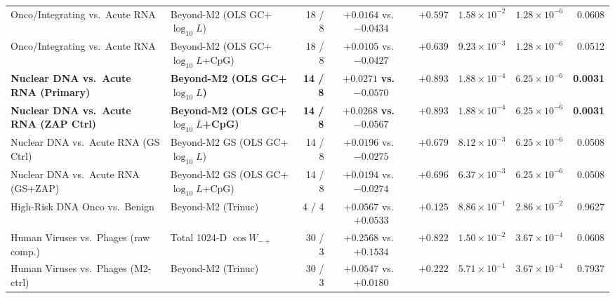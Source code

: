 \documentclass[11pt, a4paper]{article}
\DeclareRobustCommand{\_}{\textunderscore\allowbreak}
\begin{document}
\begin{table}[htbp]
{\begin{tabular}{@{}llrcrrrr@{}}
Onco/Integrating vs.\ Acute RNA & Beyond-M2 (OLS GC+$\log_{10}L$) & 18 / 8 & $+0.0164$ vs.\ $-0.0434$ & $+0.597$ & $1.58\times 10^{-2}$ & $1.28\times 10^{-6}$ & 0.0608 \\
Onco/Integrating vs.\ Acute RNA & Beyond-M2 (OLS GC+$\log_{10}L$+CpG) & 18 / 8 & $+0.0105$ vs.\ $-0.0427$ & $+0.639$ & $9.23\times 10^{-3}$ & $1.28\times 10^{-6}$ & 0.0512 \\
\midrule
\textbf{Nuclear DNA vs.\ Acute RNA (Primary)} & \textbf{Beyond-M2 (OLS GC+$\log_{10}L$)} & \textbf{14 / 8} & $\mathbf{+0.0271}$ \textbf{vs.}\ $\mathbf{-0.0570}$ & $\mathbf{+0.893}$ & \textbf{$1.88\times 10^{-4}$} & $6.25\times 10^{-6}$ & \textbf{0.0031} \\
\textbf{Nuclear DNA vs.\ Acute RNA (ZAP Ctrl)} & \textbf{Beyond-M2 (OLS GC+$\log_{10}L$+CpG)} & \textbf{14 / 8} & $\mathbf{+0.0268}$ \textbf{vs.}\ $\mathbf{-0.0567}$ & $\mathbf{+0.893}$ & \textbf{$1.88\times 10^{-4}$} & $6.25\times 10^{-6}$ & \textbf{0.0031} \\
Nuclear DNA vs.\ Acute RNA (GS Ctrl) & Beyond-M2 GS (OLS GC+$\log_{10}L$) & 14 / 8 & $+0.0196$ vs.\ $-0.0275$ & $+0.679$ & $8.12\times 10^{-3}$ & $6.25\times 10^{-6}$ & 0.0508 \\
Nuclear DNA vs.\ Acute RNA (GS+ZAP) & Beyond-M2 GS (OLS GC+$\log_{10}L$+CpG) & 14 / 8 & $+0.0194$ vs.\ $-0.0274$ & $+0.696$ & $6.37\times 10^{-3}$ & $6.25\times 10^{-6}$ & 0.0508 \\
\midrule
High-Risk DNA Onco vs.\ Benign & Beyond-M2 (Trinuc) & 4 / 4 & $+0.0567$ vs.\ $+0.0533$ & $+0.125$ & $8.86\times 10^{-1}$ & $2.86\times 10^{-2}$ & 0.9627 \\
Human Viruses vs.\ Phages (raw comp.) & Total 1024-D $\cos W_{-+}$ & 30 / 3 & $+0.2568$ vs.\ $+0.1534$ & $+0.822$ & $1.50\times 10^{-2}$ & $3.67\times 10^{-4}$ & 0.0608 \\
Human Viruses vs.\ Phages (M2-ctrl) & Beyond-M2 (Trinuc) & 30 / 3 & $+0.0547$ vs.\ $+0.0180$ & $+0.222$ & $5.71\times 10^{-1}$ & $3.67\times 10^{-4}$ & 0.7937 \\
\bottomrule
\end{tabular}
}
\end{table}
\end{document}
